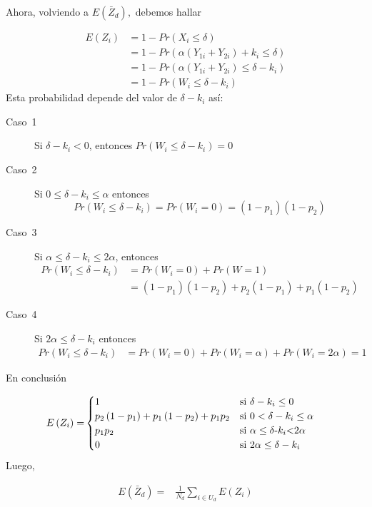 \documentclass[english]{article}
\begin{document}
Ahora, volviendo a $E\left(\bar{Z}_{d}\right),$ debemos hallar 

\begin{align*}
E\left(Z_{i}\right) & =1-Pr\left(X_{i}\le\delta\right)\\
 & =1-Pr\left(\alpha\left(Y_{1i}+Y_{2i}\right)+k_{i}\le\delta\right)\\
 & =1-Pr\left(\alpha\left(Y_{1i}+Y_{2i}\right)\le\delta-k_{i}\right)\\
 & =1-Pr\left(W_{i}\le\delta-k_{i}\right)
\end{align*}
Esta probabilidad depende del valor de $\delta-k_{i}$ as\'i:
\begin{description}
\item [{Caso~1}] Si $\delta-k_{i}<0$, entonces $Pr\left(W_{i}\le\delta-k_{i}\right)=0$
\item [{Caso~2}] Si $0\le\delta-k_{i}\le\alpha$ entonces 
\[
Pr\left(W_{i}\le\delta-k_{i}\right)=Pr\left(W_{i}=0\right)=\left(1-p_{1}\right)\left(1-p_{2}\right)
\]
\item [{Caso~3}] Si $\alpha\le\delta-k_{i}\le2\alpha$, entonces 
\begin{align*}
Pr\left(W_{i}\le\delta-k_{i}\right) & =Pr\left(W_{i}=0\right)+Pr\left(W=1\right)\\
 & =\left(1-p_{1}\right)\left(1-p_{2}\right)+p_{2}\left(1-p_{1}\right)+p_{1}\left(1-p_{2}\right)
\end{align*}
\item [{Caso~4}] Si $2\alpha\le\delta-k_{i}$ entonces
\begin{align*}
Pr\left(W_{i}\le\delta-k_{i}\right) & =Pr\left(W_{i}=0\right)+Pr\left(W_{i}=\alpha\right)+Pr\left(W_{i}=2\alpha\right)=1
\end{align*}
\end{description}
En conclusi\'on 

\begin{align*}
E\left(Z_{i}\right)= & \begin{cases}
1 & \text{si }\delta-k_{i}\le0\\
p_{2}\left(1-p_{1}\right)+p_{1}\left(1-p_{2}\right)+p_{1}p_{2} & \text{si }0<\delta-k_{i}\le\alpha\\
p_{1}p_{2} & \text{si \ensuremath{\alpha\le\delta}-\ensuremath{k_{i}}<2\ensuremath{\alpha}}\\
0 & \text{si }2\alpha\le\delta-k_{i}
\end{cases}
\end{align*}
Luego, 

\begin{align*}
E\left(\bar{Z}_{d}\right)= & \frac{1}{N_{d}}\sum_{i\in U_{d}}E\left(Z_{i}\right)
\end{align*}
\end{document}
